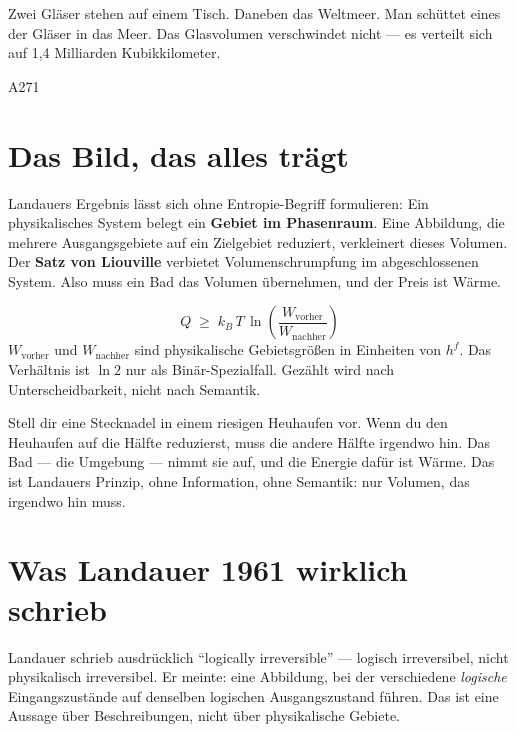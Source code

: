 \label{ch:landauer}

\epigraph{Zwei Gläser stehen auf einem Tisch. Daneben das Weltmeer.
Man schüttet eines der Gläser in das Meer. Das Glasvolumen verschwindet nicht ---
es verteilt sich auf 1,4 Milliarden Kubikkilometer.}{A271}

\section{Das Bild, das alles trägt}

Landauers Ergebnis lässt sich ohne Entropie-Begriff formulieren: Ein
physikalisches System belegt ein \textbf{Gebiet im Phasenraum}.
Eine Abbildung, die mehrere Ausgangsgebiete auf ein Zielgebiet reduziert,
verkleinert dieses Volumen. Der \textbf{Satz von Liouville} verbietet
Volumenschrumpfung im abgeschlossenen System. Also muss ein Bad das
Volumen übernehmen, und der Preis ist Wärme. 

\begin{landbox}
\[
  Q \;\ge\; k_B\,T\,\ln\!\left(\frac{W_{\text{vorher}}}{W_{\text{nachher}}}\right)
\]
$W_{\text{vorher}}$ und $W_{\text{nachher}}$ sind physikalische
Gebietsgrößen in Einheiten von $h^f$. Das Verhältnis ist $\ln 2$ nur
als Binär-Spezialfall. Gezählt wird nach Unterscheidbarkeit, nicht nach
Semantik. 
\end{landbox}

\begin{laierspur}
Stell dir eine Stecknadel in einem riesigen Heuhaufen vor.
Wenn du den Heuhaufen auf die Hälfte reduzierst, muss die andere Hälfte
irgendwo hin. Das Bad --- die Umgebung --- nimmt sie auf, und die Energie
dafür ist Wärme. Das ist Landauers Prinzip, ohne Information, ohne Semantik:
nur Volumen, das irgendwo hin muss.
\end{laierspur}

\section{Was Landauer 1961 wirklich schrieb}

Landauer schrieb ausdrücklich \enquote{logically irreversible} --- logisch
irreversibel, nicht physikalisch irreversibel. Er meinte: eine Abbildung,
bei der verschiedene \emph{logische} Eingangszustände auf denselben
logischen Ausgangszustand führen. Das ist eine Aussage über Beschreibungen,
nicht über physikalische Gebiete. 

